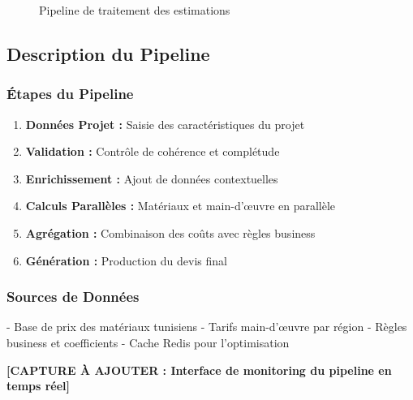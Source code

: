 \begin{figure}[h]
\caption{Pipeline de traitement des estimations}
\end{figure}

\subsection{Description du Pipeline}

\subsubsection{Étapes du Pipeline}

\begin{enumerate}
    \item \textbf{Données Projet :} Saisie des caractéristiques du projet
    \item \textbf{Validation :} Contrôle de cohérence et complétude
    \item \textbf{Enrichissement :} Ajout de données contextuelles
    \item \textbf{Calculs Parallèles :} Matériaux et main-d'œuvre en parallèle
    \item \textbf{Agrégation :} Combinaison des coûts avec règles business
    \item \textbf{Génération :} Production du devis final
\end{enumerate}

\subsubsection{Sources de Données}
- Base de prix des matériaux tunisiens
- Tarifs main-d'œuvre par région
- Règles business et coefficients
- Cache Redis pour l'optimisation

\textbf{[CAPTURE À AJOUTER : Interface de monitoring du pipeline en temps réel]}

